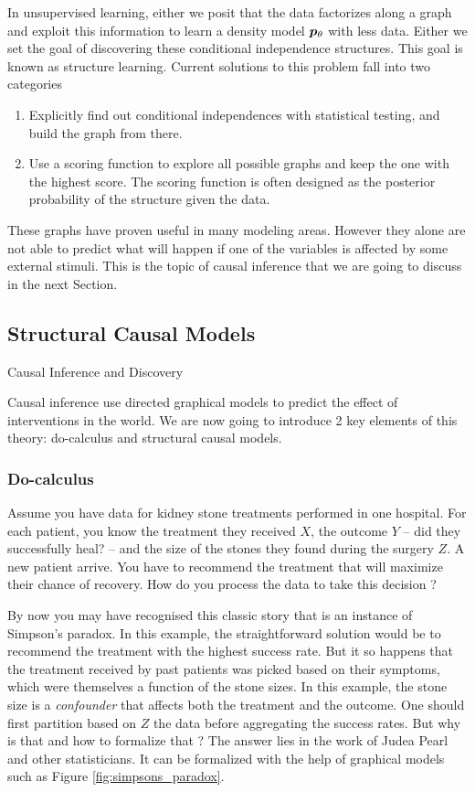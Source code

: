 In unsupervised learning, either we posit that the data factorizes along a graph and exploit this information to learn a density model $\bm{p}_{\theta}$ with less data. Either we set the goal of discovering these conditional independence structures. This goal is known as structure learning. Current solutions to this problem fall into two categories
\begin{enumerate}
    \item Explicitly find out conditional independences with statistical testing, and build the graph from there.
    \item Use a scoring function to explore all possible graphs and keep the one with the highest score. The scoring function is often designed as the posterior probability of the structure given the data.
\end{enumerate}

These graphs have proven useful in many modeling areas. However they alone are not able to predict what will happen if one of the variables is affected by some external stimuli. This is the topic of causal inference that we are going to discuss in the next Section.

\subsection{Structural Causal Models}
\label{ssec:SCM}

{Causal Inference and Discovery}

Causal inference use directed graphical models to predict the effect of interventions in the world. We are now going to introduce 2 key elements of this theory: do-calculus and structural causal models.

\subsubsection{Do-calculus}
Assume you have data for kidney stone treatments performed in one hospital. For each patient, you know the treatment they received $X$, the outcome $Y$ -- did they successfully heal? -- and the size of the stones they found during the surgery $Z$. A new patient arrive. You have to recommend the treatment that will maximize their chance of recovery.  How do you process the data to take this decision ?

By now you may have recognised this classic story that is an instance of Simpson's paradox. In this example, the straightforward solution would be to recommend the treatment with the highest success rate. But it so happens that the treatment received by past patients was picked based on their symptoms, which were themselves a function of the stone sizes. In this example, the stone size is a \textit{confounder} that affects both the treatment and the outcome. One should first partition based on $Z$ the data before aggregating the success rates. But why is that and how to formalize that ? The answer lies in the work of Judea Pearl \citep{pearl2009causality} and other statisticians. It can be formalized with the help of graphical models such as Figure \ref{fig:simpsons_paradox}.


